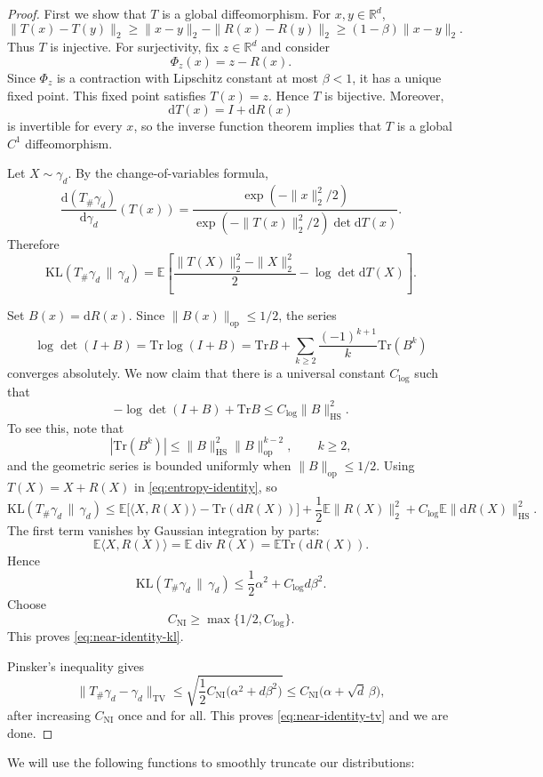 \documentclass[11pt, reqno]{amsart}
\numberwithin{equation}{section}
\theoremstyle{remark}
\newcommand{\R}{\mathbb{R}}
\newcommand{\E}{\mathbb{E}}
\newcommand{\1}{\mathbf{1}}
\newcommand{\HS}{\mathrm{HS}}
\newcommand{\op}{\mathrm{op}}
\newcommand{\TV}{\mathrm{TV}}
\newcommand{\KL}{\mathrm{KL}}
\newcommand{\Tr}{\mathrm{Tr}}
\newcommand{\dd}{\mathrm{d}}
\begin{document}
\begin{proof}
First we show that $T$ is a global diffeomorphism. For $x,y\in\R^d$,
\[
\|T(x)-T(y)\|_2
\ge
\|x-y\|_2-\|R(x)-R(y)\|_2
\ge
(1-\beta)\|x-y\|_2.
\]
Thus $T$ is injective. For surjectivity, fix $z\in\R^d$ and consider
\[
\Phi_z(x)=z-R(x).
\]
Since $\Phi_z$ is a contraction with Lipschitz constant at most $\beta<1$, it has
a unique fixed point. This fixed point satisfies $T(x)=z$. Hence $T$ is bijective.
Moreover,
\[
\dd T(x)=I+\dd R(x)
\]
is invertible for every $x$, so the inverse function theorem implies that $T$ is
a global $C^1$ diffeomorphism.

Let $X\sim\gamma_d$. By the change-of-variables formula,
\[
\frac{\dd(T_\#\gamma_d)}{\dd\gamma_d}(T(x))
=
\frac{\exp(-\|x\|_2^2/2)}
{\exp(-\|T(x)\|_2^2/2)\det \dd T(x)}.
\]
Therefore
\begin{equation}
\label{eq:entropy-identity}
\KL(T_\#\gamma_d\,\|\,\gamma_d)
=
\E\left[
\frac{\|T(X)\|_2^2-\|X\|_2^2}{2}
-
\log\det \dd T(X)
\right].
\end{equation}

Set $B(x)=\dd R(x)$. Since $\|B(x)\|_{\op}\le 1/2$, the series
\[
\log\det(I+B)
=
\Tr\log(I+B)
=
\Tr B+\sum_{k\ge2}\frac{(-1)^{k+1}}{k}\Tr(B^k)
\]
converges absolutely. We now claim that there is a universal constant $C_{\log}$ such that
\begin{equation}
\label{eq:logdet-near-identity}
-\log\det(I+B)+\Tr B
\le
C_{\log}\|B\|_{\HS}^2 .
\end{equation}
To see this, note that
\[
|\Tr(B^k)|
\le
\|B\|_{\HS}^2\|B\|_{\op}^{k-2},
\qquad k\ge 2,
\]
and the geometric series is bounded uniformly when $\|B\|_{\op}\le 1/2$.
Using $T(X)=X+R(X)$ in \eqref{eq:entropy-identity}, so
\[
\KL(T_\#\gamma_d\,\|\,\gamma_d)
\le
\E\bigl[\langle X,R(X)\rangle-\Tr(\dd R(X))\bigr]
+
\frac12\E\|R(X)\|_2^2
+
C_{\log}\E\|\dd R(X)\|_{\HS}^2.
\]
The first term vanishes by Gaussian integration by parts:
\[
\E\langle X,R(X)\rangle
=
\E\operatorname{div}R(X)
=
\E\Tr(\dd R(X)).
\]
Hence
\[
\KL(T_\#\gamma_d\,\|\,\gamma_d)
\le
\frac12\alpha^2+C_{\log}d\beta^2.
\]
Choose
\[
C_{\mathrm{NI}}\ge \max\{1/2,C_{\log}\}.
\]
This proves \eqref{eq:near-identity-kl}. 

Pinsker's inequality gives
\[
\|T_\#\gamma_d-\gamma_d\|_{\TV}
\le
\sqrt{\frac12 C_{\mathrm{NI}}\bigl(\alpha^2+d\beta^2\bigr)}
\le
C_{\mathrm{NI}}\bigl(\alpha+\sqrt d\,\beta\bigr),
\]
after increasing \(C_{\mathrm{NI}}\) once and for all. This proves
\eqref{eq:near-identity-tv} and we are done.
\end{proof}
We will use the following functions to smoothly truncate our distributions:
\end{document}
